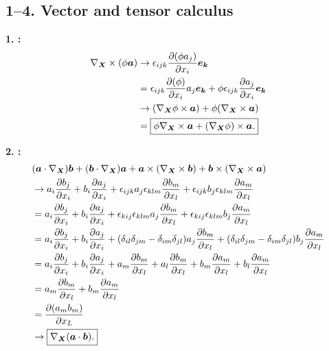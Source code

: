 \newpage
\subsection*{1--4. \textbf{Vector and tensor calculus}}

\textbf{1. :}
\begin{align*}
    \nabla_{\bm{X}} \times (\phi \bm{a}) &\rightarrow \epsilon_{ijk} \frac{\partial (\phi a_j)}{\partial x_i} \bm{e_k}\\
    &=  \epsilon_{ijk} \frac{\partial (\phi)}{\partial x_i} a_j \bm{e_k} + \phi \epsilon_{ijk} \frac{\partial a_j}{\partial x_i} \bm{e_k}\\
    &\rightarrow (\nabla_{\bm{X}} \phi \times \bm{a}) + \phi (\nabla_{\bm{X}} \times \bm{a})\\
    & = \boxed{\phi \nabla_{\bm{X}} \times \bm{a} + (\nabla_{\bm{X}}\phi) \times \bm{a}.}
\end{align*}

\textbf{2. :}
\begin{align*}
    &(\bm{a} \cdot \nabla_{\bm{X}}) \bm{b} + (\bm{b} \cdot \nabla_{\bm{X}}) \bm{a} + \bm{a} \times (\nabla_{\bm{X}} \times \bm{b}) + \bm{b} \times (\nabla_{\bm{X}} \times \bm{a}) \\
    &\rightarrow a_i \frac{\partial b_j}{\partial x_i} + b_i \frac{\partial a_j}{\partial x_i} + \epsilon_{ijk} a_j \epsilon_{klm} \frac{\partial b_m}{\partial x_l} + \epsilon_{ijk} b_j \epsilon_{klm} \frac{\partial a_m}{\partial x_l}\\
    &= a_i \frac{\partial b_j}{\partial x_i} + b_i \frac{\partial a_j}{\partial x_i} + \epsilon_{kij} \epsilon_{klm} a_j \frac{\partial b_m}{\partial x_l} + \epsilon_{kij} \epsilon_{klm} b_j \frac{\partial a_m}{\partial x_l}\\
    &= a_i \frac{\partial b_j}{\partial x_i} + b_i \frac{\partial a_j}{\partial x_i} + (\delta_{il} \delta_{jm} - \delta_{im} \delta_{jl}) a_j \frac{\partial b_m}{\partial x_l} + (\delta_{il} \delta_{jm} - \delta_{im} \delta_{jl}) b_j \frac{\partial a_m}{\partial x_l}\\
    &= a_i \frac{\partial b_j}{\partial x_i} + b_i \frac{\partial a_j}{\partial x_i} + a_m \frac{\partial b_m}{\partial x_l} + a_l \frac{\partial b_m}{\partial x_l}  + b_m \frac{\partial a_m}{\partial x_l} + b_l \frac{\partial a_m}{\partial x_l}\\
    &= a_m \frac{\partial b_m}{\partial x_l} + b_m \frac{\partial a_m}{\partial x_l}\\
    &= \frac{\partial (a_m b_m)}{\partial x_L}\\
    &\rightarrow \boxed{\nabla_{\bm{X}} (\bm{a} \cdot \bm{b}).}
\end{align*}

